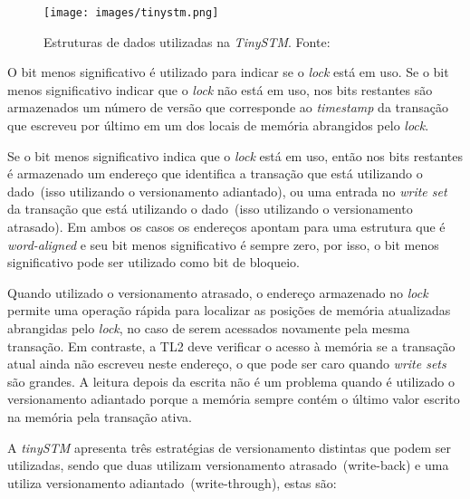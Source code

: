 \documentclass[diss,capa]{texufpel}
\begin{document}
\begin{figure}[!htp]
\centering
\texttt{[image: images/tinystm.png]}
\caption{Estruturas de dados utilizadas na \emph{TinySTM}. Fonte:~\cite{TINY}}
\label{figurasincronisacaotinystm}
\end{figure}

O bit menos significativo é utilizado para indicar se o \emph{lock} está em uso. Se o bit menos significativo indicar que o \emph{lock} não está em uso, nos bits restantes são armazenados um número de versão que corresponde ao \emph{timestamp} da transação que escreveu por último em um dos locais de memória abrangidos pelo \emph{lock}.

Se o bit menos significativo indica que o \emph{lock} está em uso, então nos bits restantes é armazenado um endereço que identifica a transação que está utilizando o dado~(isso utilizando o versionamento adiantado), ou uma entrada no \emph{write set} da transação que está utilizando o dado~(isso utilizando o versionamento atrasado). Em ambos os casos os endereços apontam para uma estrutura que é \emph{word-aligned} e seu bit menos significativo é sempre zero, por isso, o bit menos significativo pode ser utilizado como bit de bloqueio.

Quando utilizado o versionamento atrasado, o endereço armazenado no \emph{lock} permite uma operação rápida para localizar as posições de memória atualizadas abrangidas pelo \emph{lock}, no caso de serem acessados novamente pela mesma transação. Em contraste, a TL2 deve verificar o acesso à memória se a transação atual ainda não escreveu neste endereço, o que pode ser caro quando \emph{write sets} são grandes. A leitura depois da escrita não é um problema quando é utilizado o versionamento adiantado porque a memória sempre contém o último valor escrito na memória pela transação ativa.

A \emph{tinySTM} apresenta três estratégias de versionamento distintas que podem ser utilizadas, sendo que duas utilizam versionamento atrasado~(write-back) e uma utiliza versionamento adiantado~(write-through), estas são:
\end{document}
